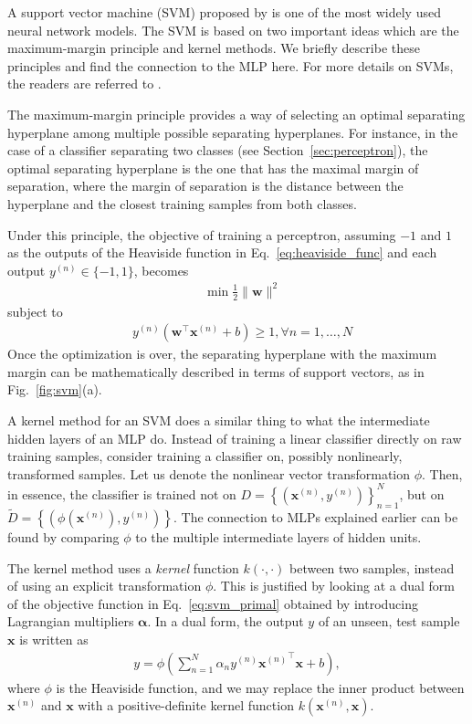 \documentclass{now}
\newcommand{\vect}[1]{\mathbf{#1}}
\newcommand{\vects}[1]{\boldsymbol{#1}}
\newcommand{\vx}[0]{\vect{x}}
\newcommand{\vw}[0]{\vect{w}}
\newcommand{\valpha}[0]{\vects{\alpha}}
\begin{document}
A support vector machine (SVM) proposed by
\citet{Cortes1995} is one of the most widely used neural
network models. The SVM is based on two important ideas
which are the maximum-margin principle and kernel methods.
We briefly describe these principles and find the
connection to the MLP here.  For more details on SVMs, the
readers are referred to \citep{Scholkopf2001}.

The maximum-margin principle provides a way of selecting an
optimal separating hyperplane among multiple possible separating
hyperplanes.
For instance, in the
case of a classifier separating two classes (see
Section~\ref{sec:perceptron}), the optimal separating
hyperplane is the one that has the maximal margin of separation,
where the margin of separation is the distance between the
hyperplane and the closest training samples from both
classes.

Under this principle, the objective of training a
perceptron, assuming $-1$ and $1$ as the outputs of the
Heaviside function in Eq.~\eqref{eq:heaviside_func} and each
output $y^{(n)} \in \{ -1, 1 \}$, becomes
\begin{align}
    \label{eq:svm_primal}
    &\min \frac{1}{2} \| \vw \|^2
\end{align}
subject to
\begin{align*}
    &y^{(n)} \left( \vw^\top \vx^{(n)} + b \right) \geq 1,
    \forall n = 1, \dots , N
\end{align*}
Once the optimization is over, the separating hyperplane
with the maximum margin can be mathematically described in
terms of support vectors, as in Fig.~\ref{fig:svm}(a).

A kernel method 
for an SVM does a similar thing to what the intermediate hidden
layers of an MLP do. Instead of training a linear classifier
directly on raw training samples, consider training a classifier
on, possibly nonlinearly, transformed samples. Let us denote the
nonlinear vector transformation $\phi$. Then, in essence,
the classifier is trained not on $D = \left\{ \left(
\vx^{(n)}, y^{(n)} \right) \right\}_{n=1}^N$, but on
$\tilde{D} = \left\{ \left( \phi(\vx^{(n)}), y^{(n)} \right)
\right\}$. The connection to MLPs explained earlier can be found
by comparing $\phi$ to the multiple intermediate layers of hidden
units.

The kernel method uses a \textit{kernel} function $k(\cdot,
        \cdot)$ between two samples, instead of using an explicit
transformation $\phi$.  This is justified by looking at a dual
form of the objective function in Eq.~\eqref{eq:svm_primal}
obtained by introducing Lagrangian multipliers $\valpha$.  In a
dual form, the output $y$ of an unseen, test sample $\vx$ is
written as
\begin{align*}
    y = \phi \left( \sum_{n=1}^N \alpha_n y^{(n)}
    {\vx^{(n)}}^\top \vx + b \right),
\end{align*}
where $\phi$ is the Heaviside function,
and we may replace the inner product between $\vx^{(n)}$ and
$\vx$  with a positive-definite kernel function
$k(\vx^{(n)}, \vx)$.
\end{document}

